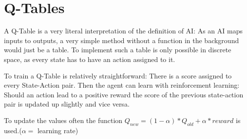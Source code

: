 \section{Q-Tables}
\label{sec:QTable}
A Q-Table is a very literal interpretation of the definition of AI: As an AI maps inputs to outputs, a very simple method without a function in the background would just be a table. To implement such a table is only possible in discrete space, as every state has to have an action assigned to it.

To train a Q-Table is relatively straightforward: There is a score assigned to every State-Action pair. Then the agent can learn with reinforcement learning: Should an action lead to a positive reward the score of the previous state-action pair is updated up slightly and vice versa.

To update the values often the function $Q_{new}=(1-\alpha)*Q_{old}+\alpha*reward$ is used.($\alpha=$ learning rate)

